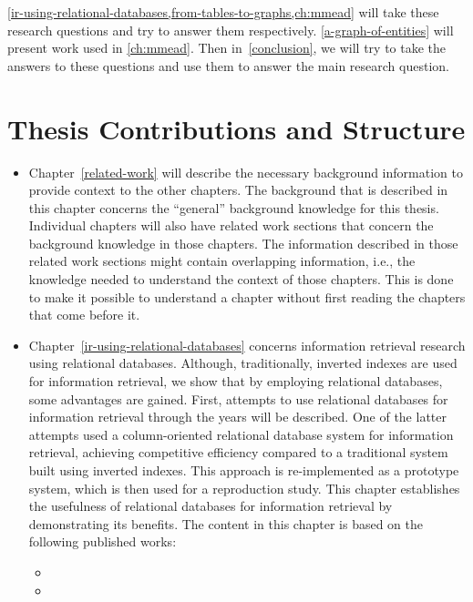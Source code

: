 \cref{ir-using-relational-databases,from-tables-to-graphs,ch:mmead} will take these research questions and try to answer them respectively. \cref{a-graph-of-entities} will present work used in \cref{ch:mmead}. Then in~\cref{conclusion}, we will try to take the answers to these questions and use them to answer the main research question. 

\section{Thesis Contributions and Structure}

\begin{itemize}
	\item Chapter~\ref{related-work} will describe the necessary background information to provide context to the other chapters. The background that is described in this chapter concerns the ``general'' background knowledge for this thesis. Individual chapters will also have related work sections that concern the background knowledge in those chapters. The information described in those related work sections might contain overlapping information, i.e., the knowledge needed to understand the context of those chapters. This is done to make it possible to understand a chapter without first reading the chapters that come before it. 
	
	\item Chapter~\ref{ir-using-relational-databases} concerns information retrieval research using relational databases. 
	Although, traditionally, inverted indexes are used for information retrieval, we show that by employing relational databases, some advantages are gained. 
	First, attempts to use relational databases for information retrieval through the years will be described. One of the latter attempts used a column-oriented relational database system for information retrieval, achieving competitive efficiency compared to a traditional system built using inverted indexes. This approach is re-implemented as a prototype system, which is then used for a reproduction study. This chapter establishes the usefulness of relational databases for information retrieval by demonstrating its benefits. The content in this chapter is based on the following published works: 
	
	{
		\scriptsize
		\begin{itemize}
			\item {}
			\item {}
		\end{itemize}
	}
	

\end{itemize}
